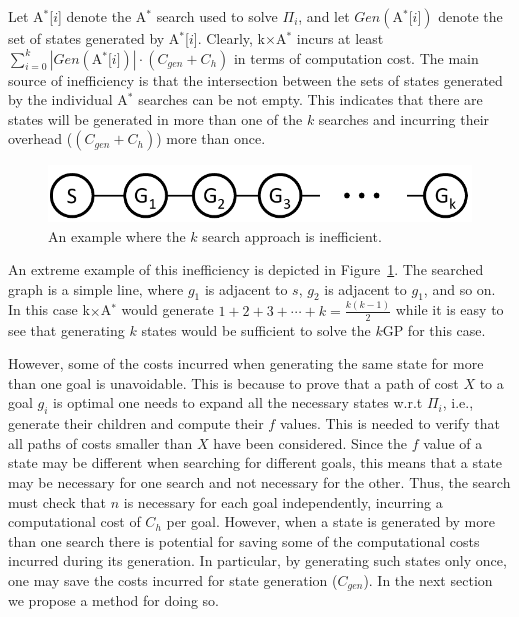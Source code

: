 \documentclass{aicom2e}
\newcommand{\kgs}{$k$GP}
\newcommand{\astar}{A$^*$}
\newcommand{\kxastar}{k$\times$A$^*$}
\newcommand{\astari}[1]{A$^*$[$#1$]}
\newcommand{\open}{\textsc{Open}}
\begin{document}


Let \astari{i} denote the \astar{} search used to solve $\Pi_i$, and let
$Gen(\text{\astari{i}})$ denote the set of states generated by \astari{i}.
Clearly, \kxastar{} incurs at least $\sum_{i=0}^k
|Gen(\text{\astari{i}})|\cdot(C_{gen}+C_{h})$ in terms of
computation cost. The main source of inefficiency is that the intersection
between the sets of states generated by the individual \astar{} searches can be
not empty. This indicates that there are states will be generated in more than
one of the $k$ searches and incurring their overhead
($(C_{gen}+C_{h})$) more than once.

\begin{figure}
    \includegraphics[width=\columnwidth]{k-search-bad_cropped}
    \caption{An example where the $k$ search approach is inefficient.}
    \label{fig:k-search-bad}
\end{figure}

An extreme example of this inefficiency is depicted in
Figure~\ref{fig:k-search-bad}. The searched graph is a simple line, where $g_1$
is adjacent to $s$, $g_2$ is adjacent to $g_1$, and so on. In this case
\kxastar{} would generate $1+2+3+\cdots+k=\frac{k(k-1)}{2}$ while it is easy to
see that generating $k$ states would be sufficient to solve the \kgs{} for this
case.



However, some of the costs incurred when generating the same state for more
than one goal is unavoidable. This is because to prove that a path of cost $X$
to a goal $g_i$ is optimal one needs to expand all the necessary states w.r.t
$\Pi_i$, i.e., generate their children and compute their $f$ values. This is
needed to verify that all paths of costs smaller than $X$ have been considered.
Since the $f$ value of a state may be different when searching for different
goals, this means that a state may be necessary for one search and not
necessary for the other. Thus, the search must check that $n$ is necessary for
each goal independently, incurring a computational cost of $C_{h}$ per goal.
However, when a state is generated by more than one search there is potential
for saving some of the computational costs incurred during its generation. In
particular, by generating such states only once, one may save the costs
incurred for state generation ($C_{gen}$). 
In the next section we propose a method for doing so.
\end{document}
